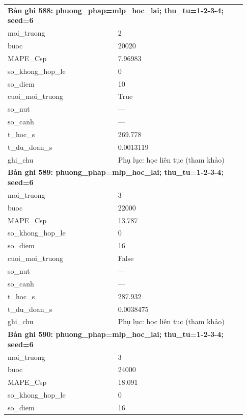 \begin{longtable}{p{0.43\linewidth}p{0.50\linewidth}}
\midrule
\multicolumn{2}{p{0.95\linewidth}}{\textbf{Bản ghi 588: phuong\_phap=mlp\_hoc\_lai; thu\_tu=1-2-3-4; seed=6}} \\
moi\_\allowbreak truong & 2 \\
buoc & 20020 \\
MAPE\_\allowbreak Csp & 7.96983 \\
so\_\allowbreak khong\_\allowbreak hop\_\allowbreak le & 0 \\
so\_\allowbreak diem & 10 \\
cuoi\_\allowbreak moi\_\allowbreak truong & True \\
so\_\allowbreak nut & — \\
so\_\allowbreak canh & — \\
t\_\allowbreak hoc\_\allowbreak s & 269.778 \\
t\_\allowbreak du\_\allowbreak doan\_\allowbreak s & 0.0013119 \\
ghi\_\allowbreak chu & Phụ lục: học liên tục (tham khảo) \\
\midrule
\multicolumn{2}{p{0.95\linewidth}}{\textbf{Bản ghi 589: phuong\_phap=mlp\_hoc\_lai; thu\_tu=1-2-3-4; seed=6}} \\
moi\_\allowbreak truong & 3 \\
buoc & 22000 \\
MAPE\_\allowbreak Csp & 13.787 \\
so\_\allowbreak khong\_\allowbreak hop\_\allowbreak le & 0 \\
so\_\allowbreak diem & 16 \\
cuoi\_\allowbreak moi\_\allowbreak truong & False \\
so\_\allowbreak nut & — \\
so\_\allowbreak canh & — \\
t\_\allowbreak hoc\_\allowbreak s & 287.932 \\
t\_\allowbreak du\_\allowbreak doan\_\allowbreak s & 0.0038475 \\
ghi\_\allowbreak chu & Phụ lục: học liên tục (tham khảo) \\
\midrule
\multicolumn{2}{p{0.95\linewidth}}{\textbf{Bản ghi 590: phuong\_phap=mlp\_hoc\_lai; thu\_tu=1-2-3-4; seed=6}} \\
moi\_\allowbreak truong & 3 \\
buoc & 24000 \\
MAPE\_\allowbreak Csp & 18.091 \\
so\_\allowbreak khong\_\allowbreak hop\_\allowbreak le & 0 \\
so\_\allowbreak diem & 16 \\

\end{longtable}
